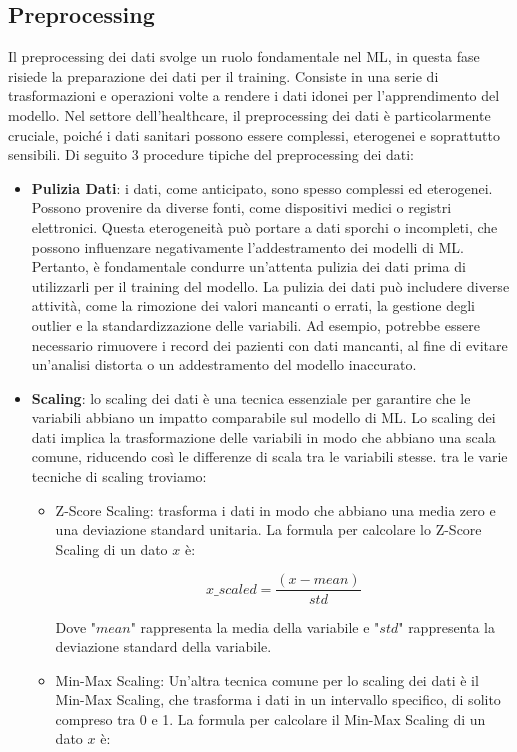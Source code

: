 \begin{flushleft}
\section{Preprocessing}
Il preprocessing dei dati svolge un ruolo fondamentale nel ML, in questa fase risiede la preparazione dei dati per il training.
Consiste in una serie di trasformazioni e operazioni volte a rendere i dati idonei per l'apprendimento del modello. 
Nel settore dell'healthcare, il preprocessing dei dati è particolarmente cruciale, poiché i dati sanitari possono essere complessi, eterogenei e soprattutto sensibili.
Di seguito 3 procedure tipiche del preprocessing dei dati: 
\begin{itemize}
    \item \textbf{Pulizia Dati}: i dati, come anticipato, sono spesso complessi ed eterogenei.
    Possono provenire da diverse fonti, come dispositivi medici o registri elettronici. 
    Questa eterogeneità può portare a dati sporchi o incompleti, che possono influenzare negativamente l'addestramento dei modelli di ML. Pertanto, è fondamentale condurre un'attenta pulizia dei dati prima di utilizzarli per il training del modello.
    La pulizia dei dati può includere diverse attività, come la rimozione dei valori mancanti o errati, la gestione degli outlier e la standardizzazione delle variabili. Ad esempio, potrebbe essere necessario rimuovere i record dei pazienti con dati mancanti, al fine di evitare un'analisi distorta o un addestramento del modello inaccurato.
    \item \textbf{Scaling}: lo scaling dei dati è una tecnica essenziale per garantire che le variabili abbiano un impatto comparabile sul modello di ML. Lo scaling dei dati implica la trasformazione delle variabili in modo che abbiano una scala comune, riducendo così le differenze di scala tra le variabili stesse.
    tra le varie tecniche di scaling troviamo:
    \begin{itemize}
        \item Z-Score Scaling: trasforma i dati in modo che abbiano una media zero e una deviazione standard unitaria. La formula per calcolare lo Z-Score Scaling di un dato $x$ è:

        
\[x\_scaled = \frac{(x - mean)}{std}\]


        Dove "$mean$" rappresenta la media della variabile e "$std$" rappresenta la deviazione standard della variabile.

    \item Min-Max Scaling: Un'altra tecnica comune per lo scaling dei dati è il Min-Max Scaling, che trasforma i dati in un intervallo specifico, di solito compreso tra 0 e 1. La formula per calcolare il Min-Max Scaling di un dato $x$ è:


\end{itemize}
\end{itemize}
\end{flushleft}
